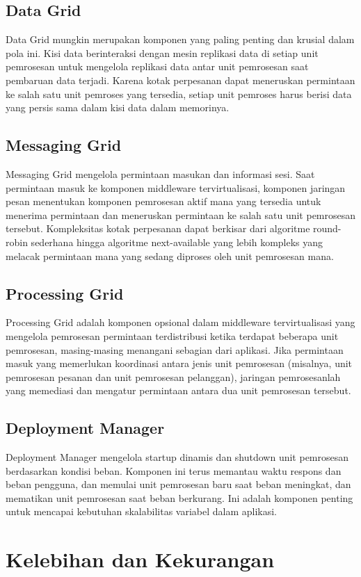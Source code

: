 \subsection{{Data Grid}}
 Data Grid mungkin merupakan komponen yang paling penting dan krusial dalam pola ini. Kisi data berinteraksi dengan mesin replikasi data di setiap unit pemrosesan untuk mengelola replikasi data antar unit pemrosesan saat pembaruan data terjadi. Karena kotak perpesanan dapat meneruskan permintaan ke salah satu unit pemroses yang tersedia, setiap unit pemroses harus berisi data yang persis sama dalam kisi data dalam memorinya.
\subsection{{Messaging Grid}}
 Messaging Grid mengelola permintaan masukan dan informasi sesi. Saat permintaan masuk ke komponen middleware tervirtualisasi, komponen jaringan pesan menentukan komponen pemrosesan aktif mana yang tersedia untuk menerima permintaan dan meneruskan permintaan ke salah satu unit pemrosesan tersebut. Kompleksitas kotak perpesanan dapat berkisar dari algoritme round-robin sederhana hingga algoritme next-available yang lebih kompleks yang melacak permintaan mana yang sedang diproses oleh unit pemrosesan mana.
\subsection{{Processing Grid}}
 Processing Grid adalah komponen opsional dalam middleware tervirtualisasi yang mengelola pemrosesan permintaan terdistribusi ketika terdapat beberapa unit pemrosesan, masing-masing menangani sebagian dari aplikasi. Jika permintaan masuk yang memerlukan koordinasi antara jenis unit pemrosesan (misalnya, unit pemrosesan pesanan dan unit pemrosesan pelanggan), jaringan pemrosesanlah yang memediasi dan mengatur permintaan antara dua unit pemrosesan tersebut.
\subsection{{Deployment Manager}}
 Deployment Manager mengelola startup dinamis dan shutdown unit pemrosesan berdasarkan kondisi beban. Komponen ini terus memantau waktu respons dan beban pengguna, dan memulai unit pemrosesan baru saat beban meningkat, dan mematikan unit pemrosesan saat beban berkurang. Ini adalah komponen penting untuk mencapai kebutuhan skalabilitas variabel dalam aplikasi.
\section{{Kelebihan dan Kekurangan}}
